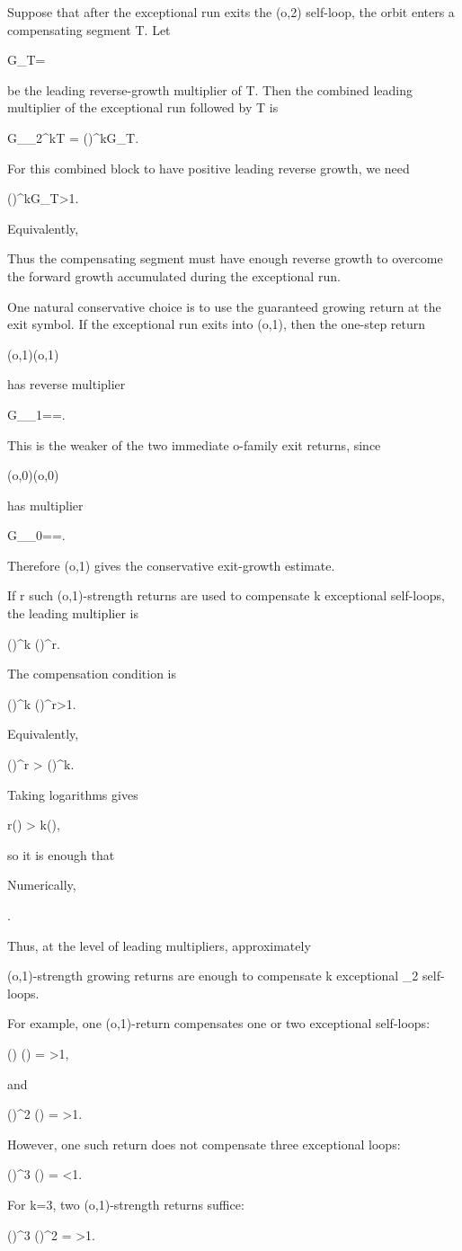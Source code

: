 \documentclass[11pt,letterpaper]{amsart}
\def\({}%
\def\){}%
\def\[{ }%
\def\]{ }%
\theoremstyle{definition}
\theoremstyle{plain}
\theoremstyle{plain}
\theoremstyle{remark}
\begin{document}
Suppose that after the exceptional run exits the \((o,2)\) self-loop,
the orbit enters a compensating segment \(T\).  Let
\[
G_T=
\]
be the leading reverse-growth multiplier of \(T\).  Then the combined
leading multiplier of the exceptional run followed by \(T\) is
\[
G_{\Omega_2^kT}
=
\left(\right)^kG_T.
\]
For this combined block to have positive leading reverse growth, we need
\[
\left(\right)^kG_T>1.
\]
Equivalently,
\[
\]
Thus the compensating segment must have enough reverse growth to overcome
the forward growth accumulated during the exceptional run.

One natural conservative choice is to use the guaranteed growing return
at the exit symbol.  If the exceptional run exits into \((o,1)\), then
the one-step return
\[
(o,1)(o,1)
\]
has reverse multiplier
\[
G_{\Omega_1}==.
\]
This is the weaker of the two immediate \(o\)-family exit returns, since
\[
(o,0)(o,0)
\]
has multiplier
\[
G_{\Omega_0}==.
\]
Therefore \((o,1)\) gives the conservative exit-growth estimate.

If \(r\) such \((o,1)\)-strength returns are used to compensate \(k\)
exceptional self-loops, the leading multiplier is
\[
\left(\right)^k
\left(\right)^r.
\]
The compensation condition is
\[
\left(\right)^k
\left(\right)^r>1.
\]
Equivalently,
\[
\left(\right)^r
>
\left(\right)^k.
\]
Taking logarithms gives
\[
r\log\left(\right)
>
k\log\left(\right),
\]
so it is enough that
\[
\]
Numerically,
\[
.
\]
Thus, at the level of leading multipliers, approximately
\[
\]
\((o,1)\)-strength growing returns are enough to compensate \(k\)
exceptional \(\Omega_2\) self-loops.

For example, one \((o,1)\)-return compensates one or two exceptional
self-loops:
\[
\left(\right)
\left(\right)
=
>1,
\]
and
\[
\left(\right)^2
\left(\right)
=
>1.
\]
However, one such return does not compensate three exceptional loops:
\[
\left(\right)^3
\left(\right)
=
<1.
\]
For \(k=3\), two \((o,1)\)-strength returns suffice:
\[
\left(\right)^3
\left(\right)^2
=
>1.
\]
\end{document}
